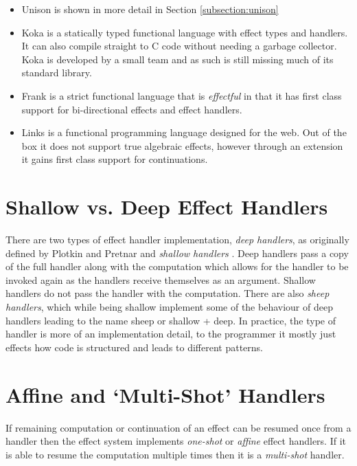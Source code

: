 \documentclass[logo,bsc,singlespacing,parskip]{infthesis}
\begin{document}
\begin{itemize}
        \item{Unison is shown in more detail in Section \ref{subsection:unison}}
        \item{Koka \cite{DBLP:journals/corr/Leijen14} is a statically typed
functional language with effect types and handlers. It can also compile
straight to C code without needing a garbage collector. Koka is developed by a
small team and as such is still missing much of its standard library.}
        \item{Frank \cite{DBLP:conf/popl/LindleyMM17} is a strict functional
language that is \emph{effectful} in that it has first class support for
bi-directional effects and effect handlers. }
        \item{Links \cite{DBLP:conf/fmco/CooperLWY06} is a functional
programming language designed for the web. Out of the box it does not support
true algebraic effects, however through an extension
\cite{DBLP:conf/icfp/HillerstromL16} it gains first class support for
continuations.}
\end{itemize}

\section{Shallow vs. Deep Effect Handlers}

There are two types of effect handler implementation, \emph{deep handlers}, as
originally defined by Plotkin and Pretnar \cite{plotkin2009handlers} and
\emph{shallow handlers} \cite{hillerstrom2018shallow}. Deep handlers pass a
copy of the full handler along with the computation which allows for the
handler to be invoked again as the handlers receive themselves as an argument.
Shallow handlers do not pass the handler with the computation. There are also
\emph{sheep handlers}, which while being shallow implement some of the
behaviour of deep handlers leading to the name sheep or shallow + deep. In
practice, the type of handler is more of an implementation detail, to the
programmer it mostly just effects how code is structured and leads to different
patterns.

\section{Affine and `Multi-Shot' Handlers}

If remaining computation or continuation of an effect can be resumed once from
a handler then the effect system implements \emph{one-shot} or \emph{affine}
effect handlers. If it is able to resume the computation multiple times then it
is a \emph{multi-shot} handler. 
\end{document}
